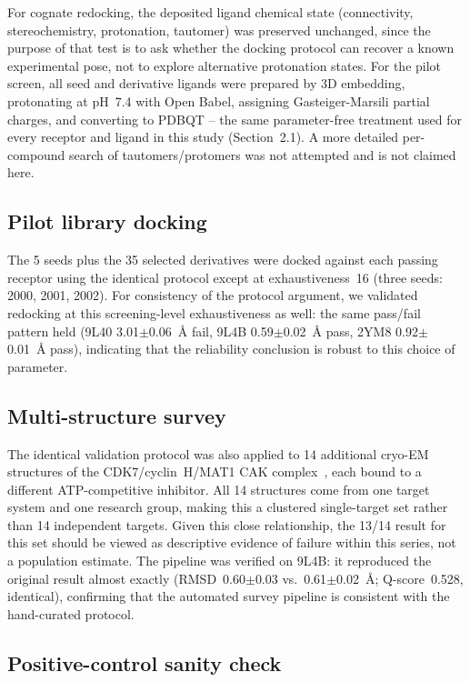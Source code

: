 \documentclass[global,twocolumn]{svjour}
\begin{document}
For cognate redocking, the deposited ligand chemical state (connectivity,
stereochemistry, protonation, tautomer) was preserved unchanged, since the
purpose of that test is to ask whether the docking protocol can recover a
known experimental pose, not to explore alternative protonation states. For
the pilot screen, all seed and derivative ligands were prepared by 3D
embedding, protonating at pH~7.4 with Open Babel, assigning Gasteiger-Marsili
partial charges, and converting to PDBQT -- the same parameter-free
treatment used for every receptor and ligand in this study (Section~2.1). A
more detailed per-compound search of tautomers/protomers was not attempted
and is not claimed here.

\subsection{Pilot library docking}

The 5 seeds plus the 35 selected derivatives were docked against each
passing receptor using the identical protocol except at exhaustiveness~16
(three seeds: 2000, 2001, 2002). For consistency of the protocol argument,
we validated redocking at this screening-level exhaustiveness as well: the
same pass/fail pattern held (9L40 3.01$\pm$0.06~\AA{} fail, 9L4B
0.59$\pm$0.02~\AA{} pass, 2YM8 0.92$\pm$0.01~\AA{} pass), indicating that
the reliability conclusion is robust to this choice of parameter.

\subsection{Multi-structure survey}

The identical validation protocol was also applied to 14 additional
cryo-EM structures of the CDK7/cyclin~H/MAT1 CAK complex~\cite{cushing2024},
each bound to a different ATP-competitive inhibitor. All 14 structures come
from one target system and one research group, making this a clustered
single-target set rather than 14 independent targets. Given this close
relationship, the 13/14 result for this set should be viewed as descriptive
evidence of failure within this series, not a population estimate. The
pipeline was verified on 9L4B: it reproduced the original result almost
exactly (RMSD~0.60$\pm$0.03 vs.\ 0.61$\pm$0.02~\AA{}; Q-score~0.528,
identical), confirming that the automated survey pipeline is consistent
with the hand-curated protocol.

\subsection{Positive-control sanity check}
\end{document}
